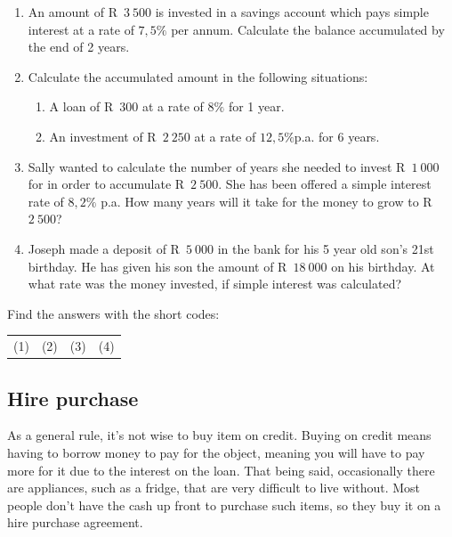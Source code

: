 \begin{exercises}{}{
    \begin{enumerate}[itemsep=6pt, label=\textbf{\arabic*}.]
	\item An amount of R~$3~500$ is invested in a savings account which pays simple interest at a rate of $7,5\%$ per annum. Calculate the balance accumulated by the end of 2 years.

	\item Calculate the accumulated amount in the following situations:
	\begin{enumerate}[noitemsep, label=\textbf{(\alph*)} ]
	    \item A loan of R~$300$ at a rate of $8\%$ for 1 year.

	    \item An investment of R~$2~250$ at a rate of $12,5\%$p.a. for 6 years.
	\end{enumerate}

	\item Sally wanted to calculate the number of years she needed to invest R~$1~000$ for in order to accumulate R~$2~500$. She has been offered a simple interest rate of $8,2\%$ p.a. How many years will it take for the money to grow to R~$2~500$?

	\item Joseph made a deposit of R~$5~000$ in the bank for his 5 year old son’s 21st birthday. He has given his son the amount of R~$18~000$ on his birthday. At what rate was the money invested, if simple interest was calculated?\\
    \end{enumerate}

    Find the answers with the short codes:\\
    \begin{tabularx}{\textwidth}{ XXXX }
	(1)	&	(2)	&	(3)	&	(4)\\
    \end{tabularx}
}
\end{exercises}


\subsection{Hire purchase}

As a general rule, it’s not wise to buy item on credit. Buying on credit means having to borrow money to pay for the object, meaning you will have to pay more for it due to the interest on the loan. That being said, occasionally there are appliances, such as a fridge, that are very difficult to live without. Most people don’t have the cash up front to purchase such items, so they buy it on a hire purchase agreement.\par


